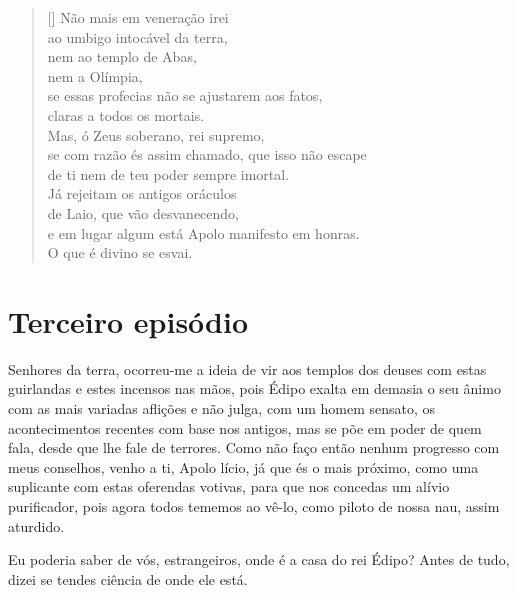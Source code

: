 
\settowidth{\versewidth}{brilhante? Tenso, agito-me com medo em meu trêmulo}
\begin{verse}[\versewidth] 
Não mais em veneração irei\\ 
ao umbigo intocável da terra,\\
nem ao templo de Abas,\\
nem a Olímpia,\\
se essas profecias não se ajustarem aos fatos,\\
claras a todos os mortais.\\
Mas, ó Zeus soberano, rei supremo,\\
se com razão és assim chamado, que isso não escape\\
de ti nem de teu poder sempre imortal.\\
Já rejeitam os antigos oráculos\\
de Laio, que vão desvanecendo,\\
e em lugar algum está Apolo manifesto em honras.\\
O que é divino se esvai.
\end{verse}

\section{Terceiro episódio}


   Senhores da terra, ocorreu-me a ideia de vir aos templos dos deuses com
estas guirlandas e estes incensos nas mãos, pois Édipo exalta em demasia
o seu ânimo com as mais variadas aflições e não julga, com um homem
sensato, os acontecimentos recentes com base nos antigos, mas se põe em
poder de quem fala, desde que lhe fale de terrores. Como não faço então
nenhum progresso com meus conselhos, venho a ti, Apolo lício, já
que és o mais próximo, como uma suplicante com estas oferendas votivas,
para que nos concedas um alívio purificador, pois agora todos tememos ao
vê-lo, como piloto de nossa nau, assim aturdido.


   Eu poderia saber de vós, estrangeiros, onde é a casa do rei Édipo? Antes
de tudo, dizei se tendes ciência de onde ele está.

